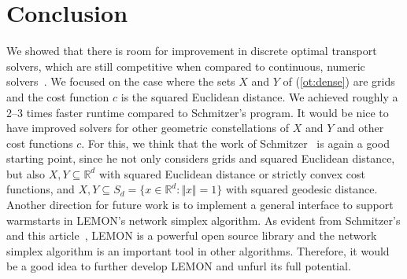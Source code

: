 \documentclass[a4paper,UKenglish,cleveref, autoref, thm-restate]{lipics-v2021}
\begin{document}
\section{Conclusion}
We showed that there is room for improvement in discrete optimal transport solvers, which are still competitive when compared to continuous, numeric solvers~\cite{schrieber2017dotmark}.
We focused on the case where the sets $X$ and $Y$ of (\ref{ot:dense}) are grids and the cost function $c$ is the squared Euclidean distance.
We achieved roughly a 2--3 times faster runtime compared to Schmitzer's program.
It would be nice to have improved solvers for other geometric constellations of $X$ and $Y$ and other cost functions $c$.
For this, we think that the work of Schmitzer~\cite{schmitzer2016sparse} is again a good starting point, since he not only considers grids and squared Euclidean distance, but also $X,Y \subseteq \mathbb{R}^d$ with squared Euclidean distance or strictly convex cost functions, and $X,Y \subseteq S_d = \{x \in \mathbb{R}^d: \Vert x \Vert = 1\}$ with squared geodesic distance.
Another direction for future work is to implement a general interface to support warmstarts in LEMON's network simplex algorithm.
As evident from Schmitzer's and this article~\cite{schmitzer2016sparse}, LEMON is a powerful open source library and the network simplex algorithm is an important tool in other algorithms.
Therefore, it would be a good idea to further develop LEMON and unfurl its full potential.



\newpage
\appendix
\end{document}
